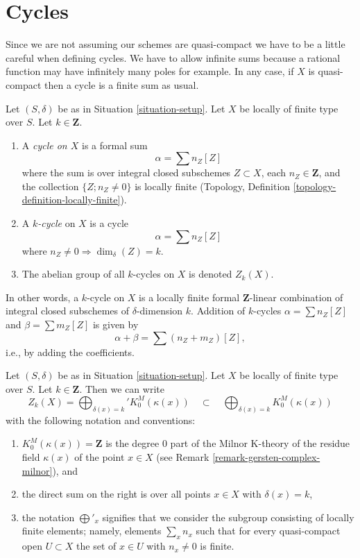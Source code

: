 \section{Cycles}
\label{section-cycles}

\noindent
Since we are not assuming our schemes are quasi-compact we have
to be a little careful when defining cycles. We have to allow
infinite sums because a rational function may have infinitely many
poles for example. In any case, if $X$ is quasi-compact then a
cycle is a finite sum as usual.

\begin{definition}
\label{definition-cycles}
Let $(S, \delta)$ be as in Situation \ref{situation-setup}.
Let $X$ be locally of finite type over $S$.
Let $k \in \mathbf{Z}$.
\begin{enumerate}
\item A {\it cycle on $X$} is a formal sum
$$
\alpha = \sum n_Z [Z]
$$
where the sum is over integral closed subschemes $Z \subset X$,
each $n_Z \in \mathbf{Z}$, and the collection
$\{Z; n_Z \not = 0\}$ is locally finite
(Topology, Definition \ref{topology-definition-locally-finite}).
\item A {\it $k$-cycle} on $X$ is a cycle
$$
\alpha = \sum n_Z [Z]
$$
where $n_Z \not = 0 \Rightarrow \dim_\delta(Z) = k$.
\item The abelian group of all $k$-cycles on $X$ is denoted $Z_k(X)$.
\end{enumerate}
\end{definition}

\noindent
In other words, a $k$-cycle on $X$
is a locally finite formal $\mathbf{Z}$-linear
combination of integral closed subschemes of $\delta$-dimension $k$.
Addition of $k$-cycles $\alpha = \sum n_Z[Z]$ and
$\beta = \sum m_Z[Z]$ is given by
$$
\alpha + \beta = \sum (n_Z + m_Z)[Z],
$$
i.e., by adding the coefficients.

\begin{remark}
\label{remark-cycles-pointwise}
Let $(S, \delta)$ be as in Situation \ref{situation-setup}.
Let $X$ be locally of finite type over $S$. Let $k \in \mathbf{Z}$.
Then we can write
$$
Z_k(X) = \bigoplus\nolimits_{\delta(x) = k}' K_0^M(\kappa(x))
\quad\subset\quad
\bigoplus\nolimits_{\delta(x) = k} K_0^M(\kappa(x))
$$
with the following notation and conventions:
\begin{enumerate}
\item $K_0^M(\kappa(x)) = \mathbf{Z}$ is the degree $0$ part of
the Milnor K-theory of the residue field $\kappa(x)$ of the point
$x \in X$ (see Remark \ref{remark-gersten-complex-milnor}), and
\item the direct sum on the right is over all points $x \in X$
with $\delta(x) = k$,
\item the notation $\bigoplus'_x$ signifies that we consider the
subgroup consisting of locally finite elements; namely, elements
$\sum_x n_x$ such that for every quasi-compact open $U \subset X$
the set of $x \in U$ with $n_x \not = 0$ is finite.
\end{enumerate}
\end{remark}

